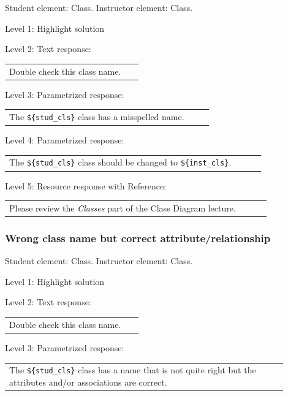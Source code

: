 Student element: Class. Instructor element: Class. \medskip

\noindent Level 1: Highlight solution  \medskip

\noindent Level 2: Text response: \medskip

\begin{tabular}{|p{0.9\linewidth}}
Double check this class name.
\end{tabular} \medskip

\noindent Level 3: Parametrized response: \medskip

\begin{tabular}{|p{0.9\linewidth}}
The \verb|${stud_cls}| class has a misspelled name.
\end{tabular} \medskip

\noindent Level 4: Parametrized response: \medskip

\begin{tabular}{|p{0.9\linewidth}}
The \verb|${stud_cls}| class should be changed to \verb|${inst_cls}|.
\end{tabular} \medskip

\noindent Level 5: Resource response with Reference: \medskip

\begin{tabular}{|p{0.9\linewidth}}
Please review the \textit{Classes} part of the Class Diagram lecture.
\end{tabular} \medskip


\subsubsection{Wrong class name but correct attribute/relationship}

Student element: Class. Instructor element: Class. \medskip

\noindent Level 1: Highlight solution  \medskip

\noindent Level 2: Text response: \medskip

\begin{tabular}{|p{0.9\linewidth}}
Double check this class name.
\end{tabular} \medskip

\noindent Level 3: Parametrized response: \medskip

\begin{tabular}{|p{0.9\linewidth}}
The \verb|${stud_cls}| class has a name that is not quite right but the attributes and/or associations are correct.
\end{tabular} \medskip


